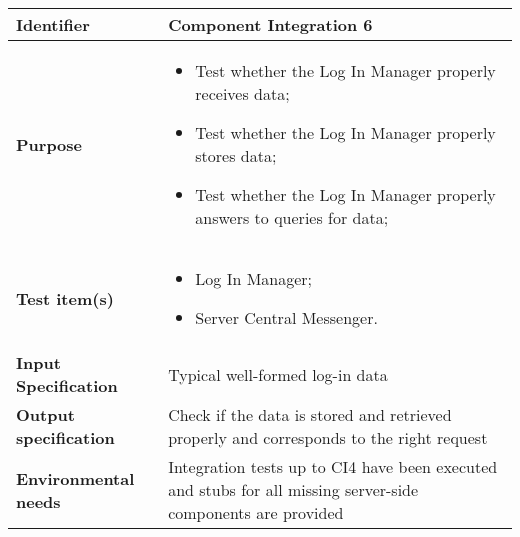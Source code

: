 \begin{center}
\begin{tabular}{lp{}}
\toprule
\textbf{Identifier}		&	Component Integration 6\\
\midrule
\textbf{Purpose}		&	\begin{itemize}
					\item Test whether the Log In Manager properly receives data;
					\item Test whether the Log In Manager properly stores data;
					\item Test whether the Log In Manager properly answers to queries for data;
					\end{itemize}	\\
\textbf{Test item(s)}	&	\begin{itemize}
					\item Log In Manager;
					\item Server Central Messenger.
					\end{itemize}	\\
\textbf{Input Specification}	&	Typical well-formed log-in data\\
\textbf{Output specification}	&	Check if the data is stored and retrieved properly and corresponds to the right request\\
\textbf{Environmental needs}	&	Integration tests up to CI4 have been executed and stubs for all missing server-side components are provided\\
\bottomrule
\end{tabular}
\end{center}

